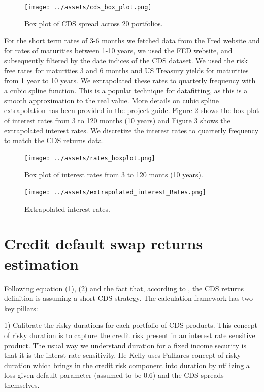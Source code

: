 \documentclass{article}
\begin{document}
\begin{figure}[H]
    \centering
    \texttt{[image: ../assets/cds\_box\_plot.png]}
    \caption{\label{fig:cds_rates_box}Box plot of CDS spread across 20 portfolios.}
    
    \end{figure}

    For the short term rates of 3-6 months we fetched data from the Fred website and for rates of maturities between 1-10 years, we used the FED website, and subsequently filtered by the date indices of the CDS dataset. We used the risk free rates for maturities 3 and 6 months and US Treasury yields for maturities from 1 year to 10 years. 
    We extrapolated these rates to quarterly frequency with a cubic spline function. This is a popular technique for datafitting, as this is a smooth approximation to the real value. More details on cubic spline extrapolation has been provided in the project guide. 
    Figure \ref{fig:interest_raw} shows the box plot of interest rates from 3 to 120 months (10 years) and Figure \ref{fig:interest_spline} shows the extrapolated interest rates. We discretize the interest rates to quarterly frequency to match the CDS returns data.
\begin{figure}[H]
    \centering
    \texttt{[image: ../assets/rates\_boxplot.png]}
    \caption{\label{fig:interest_raw}Box plot of interest rates from 3 to 120 monts (10 years).}
    \end{figure}

\begin{figure}[H]
    \centering
    \texttt{[image: ../assets/extrapolated\_interest\_Rates.png]}
    \caption{\label{fig:interest_spline}Extrapolated interest rates.}
    \end{figure}    


\section{Credit default swap returns estimation}
Following equation (1), (2) and the fact that, according to \cite{kelly2017}, the CDS returns definition is assuming a short CDS strategy. The calculation framework has two key pillars:

1) Calibrate the risky durations for each portfolio of CDS products. This concept of risky duration is to capture the credit risk present in an interest rate sensitive product. The usual way we understand duration for a fixed income security is that it is the interst rate sensitivity. He Kelly uses Palhares concept of risky duration which brings in the credit risk component into duration by utilizing a loss given default parameter (assumed to be 0.6) and the CDS spreads themselves. 
\end{document}
